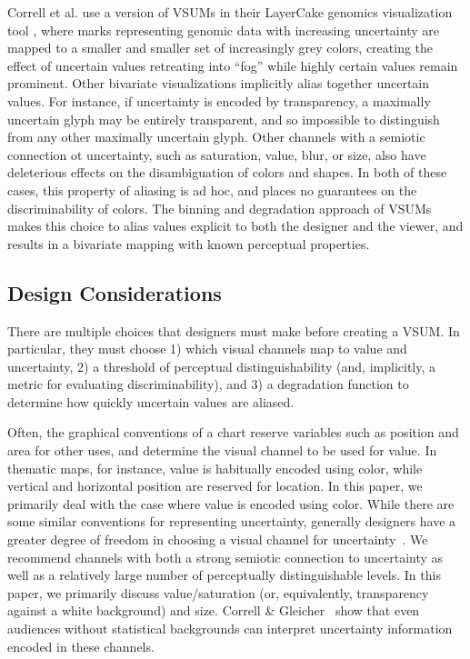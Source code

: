 \documentclass{vgtc}                          %
\begin{document}
Correll et al. use a version of VSUMs in their LayerCake genomics visualization tool \cite{correll2015layercake,correll2011visualizing}, where marks representing genomic data with increasing uncertainty are mapped to a smaller and smaller set of increasingly grey colors, creating the effect of uncertain values retreating into ``fog'' while highly certain values remain prominent. Other bivariate visualizations implicitly alias together uncertain values. For instance, if uncertainty is encoded by transparency, a maximally uncertain glyph may be entirely transparent, and so impossible to distinguish from any other maximally uncertain glyph. Other channels with a semiotic connection ot uncertainty, such as saturation, value, blur, or size, also have deleterious effects on the disambiguation of colors and shapes. In both of these cases, this property of aliasing is ad hoc, and places no guarantees on the discriminability of colors. The binning and degradation approach of VSUMs makes this choice to alias values explicit to both the designer and the viewer, and results in a bivariate mapping with known perceptual properties.

\subsection{Design Considerations}

\performanceFig

There are multiple choices that designers must make before creating a VSUM. In particular, they must choose 1) which visual channels map to value and uncertainty, 2) a threshold of perceptual distinguishability (and, implicitly, a metric for evaluating discriminability), and 3) a degradation function to determine how quickly uncertain values are aliased. 

Often, the graphical conventions of a chart reserve variables such as position and area for other uses, and determine the visual channel to be used for value. In thematic maps, for instance, value is habitually encoded using color, while vertical and horizontal position are reserved for location. In this paper, we primarily deal with the case where value is encoded using color. While there are some similar conventions for representing uncertainty, generally designers have a greater degree of freedom in choosing a visual channel for uncertainty~\cite{maceachren1992visualizing}. We recommend channels with both a strong semiotic connection to uncertainty as well as a relatively large number of perceptually distinguishable levels. In this paper, we primarily discuss value/saturation (or, equivalently, transparency against a white background) and size. Correll \& Gleicher~\cite{correll2013error} show that even audiences without statistical backgrounds can interpret uncertainty information encoded in these channels.
\end{document}
